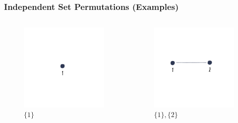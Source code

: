 \begin{frame}
  \frametitle{Independent Set Permutations (Examples)}
  
  \begin{columns}[c]
    \begin{column}{0.48\textwidth}
      \begin{figure}
        \centering
        \includegraphics[width=0.85\linewidth]{figures/lec/i1.png}
        \caption {$\{1\}$}
      \end{figure}
    \end{column}
    \begin{column}{0.48\textwidth}
      \begin{figure}
        \centering
        \includegraphics[width=0.85\linewidth]{figures/lec/i2.png}
        \caption {$\{1\}, \{2\}$}
      \end{figure}
    \end{column}
  \end{columns}
\end{frame}

